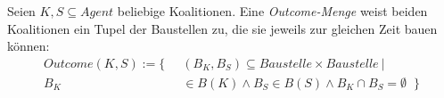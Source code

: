 \begin{definition}
  Seien $K, S \subseteq Agent$ beliebige Koalitionen. Eine \textit{Outcome-Menge} weist beiden Koalitionen ein Tupel der Baustellen zu, die sie jeweils zur gleichen Zeit bauen können:
\begin{align}
  Outcome(K,S) := \{ \; \;
  &(B_K,B_S)\subseteq Baustelle\times Baustelle\ | \\
  B_K &\in B(K) \land B_S\in B(S)\land B_K\cap B_S =\emptyset \;\;\}
\end{align}
\end{definition}

\noindent
%
%
%
%
